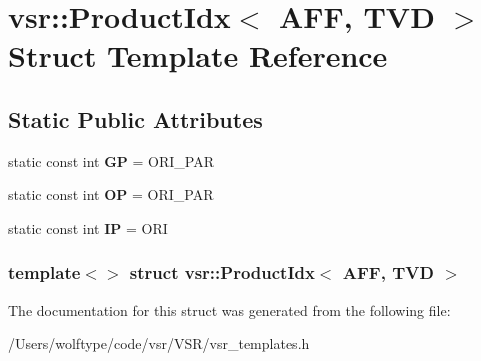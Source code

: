 \hypertarget{structvsr_1_1_product_idx_3_01_a_f_f_00_01_t_v_d_01_4}{\section{vsr\-:\-:Product\-Idx$<$ A\-F\-F, T\-V\-D $>$ Struct Template Reference}
\label{structvsr_1_1_product_idx_3_01_a_f_f_00_01_t_v_d_01_4}
}
\subsection*{Static Public Attributes}
\begin{DoxyCompactItemize}
\item 
\hypertarget{structvsr_1_1_product_idx_3_01_a_f_f_00_01_t_v_d_01_4_ac5e0041cbdd75bd2d6830bde0b5a78dd}{static const int {\bfseries G\-P} = O\-R\-I\-\_\-\-P\-A\-R}\label{structvsr_1_1_product_idx_3_01_a_f_f_00_01_t_v_d_01_4_ac5e0041cbdd75bd2d6830bde0b5a78dd}

\item 
\hypertarget{structvsr_1_1_product_idx_3_01_a_f_f_00_01_t_v_d_01_4_abab8e4ab2b322eece81d3c4d23f263e2}{static const int {\bfseries O\-P} = O\-R\-I\-\_\-\-P\-A\-R}\label{structvsr_1_1_product_idx_3_01_a_f_f_00_01_t_v_d_01_4_abab8e4ab2b322eece81d3c4d23f263e2}

\item 
\hypertarget{structvsr_1_1_product_idx_3_01_a_f_f_00_01_t_v_d_01_4_a3867cf7d621d7189079c3df2a64bb8e0}{static const int {\bfseries I\-P} = O\-R\-I}\label{structvsr_1_1_product_idx_3_01_a_f_f_00_01_t_v_d_01_4_a3867cf7d621d7189079c3df2a64bb8e0}

\end{DoxyCompactItemize}
\subsubsection*{template$<$$>$ struct vsr\-::\-Product\-Idx$<$ A\-F\-F, T\-V\-D $>$}



The documentation for this struct was generated from the following file\-:\begin{DoxyCompactItemize}
\item 
/\-Users/wolftype/code/vsr/\-V\-S\-R/vsr\-\_\-templates.\-h\end{DoxyCompactItemize}
